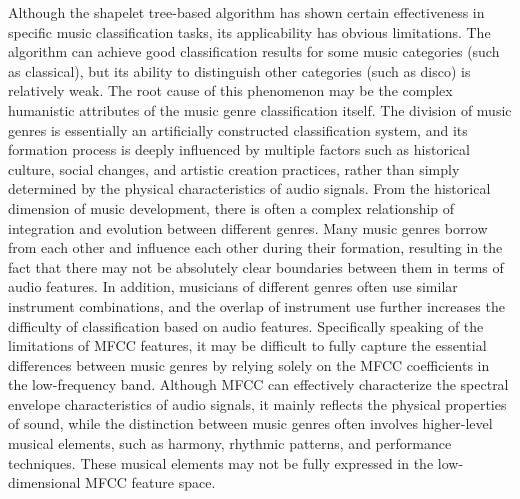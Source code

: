Although the shapelet tree-based algorithm has shown certain effectiveness in specific music classification tasks, its applicability has obvious limitations. The algorithm can achieve good classification results for some music categories (such as classical), but its ability to distinguish other categories (such as disco) is relatively weak. The root cause of this phenomenon may be the complex humanistic attributes of the music genre classification itself. The division of music genres is essentially an artificially constructed classification system, and its formation process is deeply influenced by multiple factors such as historical culture, social changes, and artistic creation practices, rather than simply determined by the physical characteristics of audio signals. From the historical dimension of music development, there is often a complex relationship of integration and evolution between different genres. Many music genres borrow from each other and influence each other during their formation, resulting in the fact that there may not be absolutely clear boundaries between them in terms of audio features. In addition, musicians of different genres often use similar instrument combinations, and the overlap of instrument use further increases the difficulty of classification based on audio features. Specifically speaking of the limitations of MFCC features, it may be difficult to fully capture the essential differences between music genres by relying solely on the MFCC coefficients in the low-frequency band. Although MFCC can effectively characterize the spectral envelope characteristics of audio signals, it mainly reflects the physical properties of sound, while the distinction between music genres often involves higher-level musical elements, such as harmony, rhythmic patterns, and performance techniques. These musical elements may not be fully expressed in the low-dimensional MFCC feature space.\\
\\
